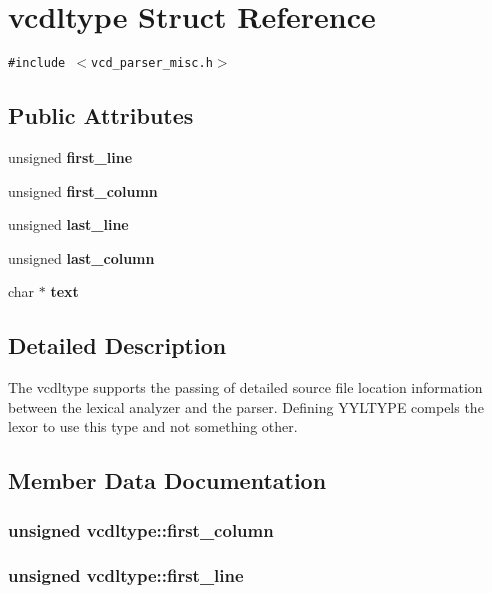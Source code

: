 \section{vcdltype  Struct Reference}
\label{structvcdltype}
{\tt \#include $<$vcd\_\-parser\_\-misc.h$>$}

\subsection*{Public Attributes}
\begin{CompactItemize}
\item 
unsigned {\bf first\_\-line}
\item 
unsigned {\bf first\_\-column}
\item 
unsigned {\bf last\_\-line}
\item 
unsigned {\bf last\_\-column}
\item 
char $\ast$ {\bf text}
\end{CompactItemize}


\subsection{Detailed Description}
The vcdltype supports the passing of detailed source file location information between the lexical analyzer and the parser. Defining YYLTYPE compels the lexor to use this type and not something other. 



\subsection{Member Data Documentation}
\subsubsection{\setlength{\rightskip}{0pt plus 5cm}unsigned vcdltype::first\_\-column}\label{structvcdltype_m1}


\subsubsection{\setlength{\rightskip}{0pt plus 5cm}unsigned vcdltype::first\_\-line}\label{structvcdltype_m0}


